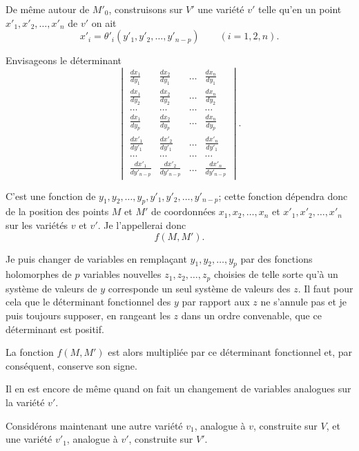 \documentclass{article}
\begin{document}
De même autour de $M'_{0}$, construisons sur $V'$ une variété $v'$ telle qu'en un point $x'_{1}, x'_{2}, \ldots, x'_{n}$ de $v'$ on ait
\[
x'_{i} = \theta'_{i}(y'_{1}, y'_{2}, \ldots, y'_{n-p}) \qquad (i = 1, 2, n).
\]

Envisageons le déterminant
\[
\begin{vmatrix}
\frac{dx_{1}}{dy_{1}} & \frac{dx_{2}}{dy_{1}} & \ldots & \frac{dx_{n}}{dy_{1}} \\[1ex]
\frac{dx_{1}}{dy_{2}} & \frac{dx_{2}}{dy_{2}} & \ldots & \frac{dx_{n}}{dy_{2}} \\[1ex]
\ldots & \ldots & \ldots & \ldots \\[1ex]
\frac{dx_{1}}{dy_{p}} & \frac{dx_{2}}{dy_{p}} & \ldots & \frac{dx_{n}}{dy_{p}} \\[1ex]
\frac{dx'_{1}}{dy'_{1}} & \frac{dx'_{2}}{dy'_{1}} & \ldots & \frac{dx'_{n}}{dy'_{1}} \\[1ex]
\ldots & \ldots & \ldots & \ldots \\[1ex]
\frac{dx'_{1}}{dy'_{n-p}} & \frac{dx'_{2}}{dy'_{n-p}} & \ldots & \frac{dx'_{n}}{dy'_{n-p}}
\end{vmatrix}.
\]

C'est une fonction de $y_{1}, y_{2}, \ldots, y_{p}, y'_{1}, y'_{2}, \ldots, y'_{n-p}$; cette fonction dépendra donc de la position des points $M$ et $M'$ de coordonnées $x_{1}, x_{2}, \ldots, x_{n}$ et $x'_{1}, x'_{2}, \ldots, x'_{n}$ sur les variétés $v$ et $v'$. Je l'appellerai donc
\[
f(M, M').
\]

Je puis changer de variables en remplaçant $y_{1}, y_{2}, \ldots, y_{p}$ par des fonctions holomorphes de $p$ variables nouvelles $z_{1}, z_{2}, \ldots, z_{p}$ choisies de telle sorte qu'à un système de valeurs de $y$ corresponde un seul système de valeurs des $z$. Il faut pour cela que le déterminant fonctionnel des $y$ par rapport aux $z$ ne s'annule pas et je puis toujours supposer, en rangeant les $z$ dans un ordre convenable, que ce déterminant est positif.

La fonction $f(M, M')$ est alors multipliée par ce déterminant fonctionnel et, par conséquent, conserve son signe.

Il en est encore de même quand on fait un changement de variables analogues sur la variété $v'$.

Considérons maintenant une autre variété $v_{1}$, analogue à $v$, construite sur $V$, et une variété $v'_{1}$, analogue à $v'$, construite sur $V'$.
\end{document}
